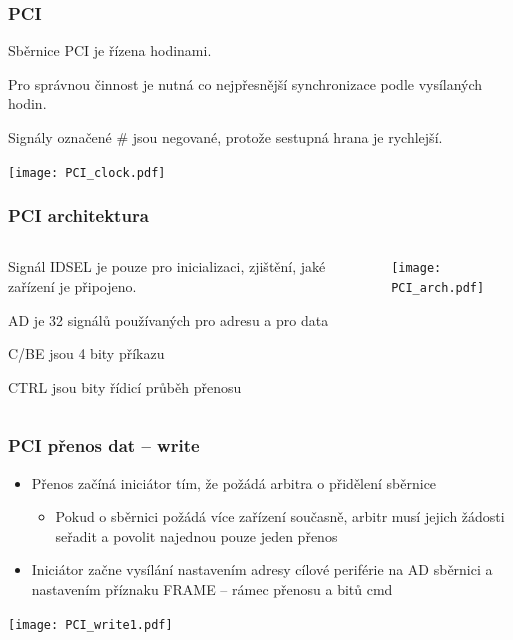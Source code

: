 \documentclass{beamer}
\begin{document}
\begin{frame}
\frametitle{PCI}

Sběrnice PCI je řízena hodinami. 

Pro správnou činnost je nutná co nejpřesnější synchronizace podle vysílaných hodin.

Signály označené \# jsou negované, protože sestupná hrana je rychlejší.

\begin{center}  
\texttt{[image: PCI\_clock.pdf]}
\end{center}
\end{frame}

\begin{frame}
\frametitle{PCI architektura}

\begin{columns}
\begin{column}{0.35\textwidth}
Signál IDSEL je pouze pro inicializaci, zjištění, jaké zařízení je připojeno.

\bigskip
AD je 32 signálů používaných pro adresu a pro data

\bigskip
C/BE jsou 4 bity příkazu

\bigskip
CTRL jsou bity řídicí průběh přenosu
\end{column}
\begin{column}{0.6\textwidth}  
\texttt{[image: PCI\_arch.pdf]}
\end{column}
\end{columns}

\end{frame}


\begin{frame}
\frametitle{PCI přenos dat -- write}

\begin{itemize}
\item Přenos začíná iniciátor tím, že požádá arbitra o přidělení sběrnice
\begin{itemize}
\item Pokud o sběrnici požádá více zařízení současně, arbitr musí jejich žádosti seřadit a povolit najednou pouze jeden přenos
\end{itemize}
\item Iniciátor začne vysílání nastavením adresy cílové periférie na AD sběrnici a nastavením příznaku FRAME -- rámec přenosu a bitů cmd
\end{itemize}

\texttt{[image: PCI\_write1.pdf]}

\end{frame}
\end{document}
